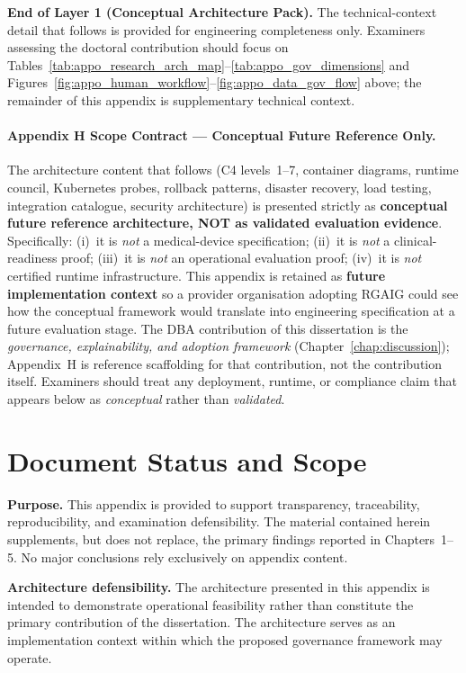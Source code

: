 \noindent\textbf{End of Layer 1 (Conceptual Architecture Pack).} The technical-context detail that follows is provided for engineering completeness only. Examiners assessing the doctoral contribution should focus on Tables~\ref{tab:appo_research_arch_map}--\ref{tab:appo_gov_dimensions} and Figures~\ref{fig:appo_human_workflow}--\ref{fig:appo_data_gov_flow} above; the remainder of this appendix is supplementary technical context.

\paragraph{Appendix H Scope Contract --- Conceptual Future Reference Only.}
\label{para:appendix_h_scope_contract}
The architecture content that follows (C4 levels~1--7, container diagrams, runtime council, Kubernetes probes, rollback patterns, disaster recovery, load testing, integration catalogue, security architecture) is presented strictly as \textbf{conceptual future reference architecture, NOT as validated evaluation evidence}. Specifically: (i)~it is \emph{not} a medical-device specification; (ii)~it is \emph{not} a clinical-readiness proof; (iii)~it is \emph{not} an operational evaluation proof; (iv)~it is \emph{not} certified runtime infrastructure. This appendix is retained as \textbf{future implementation context} so a provider organisation adopting RGAIG could see how the conceptual framework would translate into engineering specification at a future evaluation stage. The DBA contribution of this dissertation is the \emph{governance, explainability, and adoption framework} (Chapter~\ref{chap:discussion}); Appendix~H is reference scaffolding for that contribution, not the contribution itself. Examiners should treat any deployment, runtime, or compliance claim that appears below as \emph{conceptual} rather than \emph{validated}.

\section{Document Status and Scope}


\noindent\textbf{Purpose.} This appendix is provided to support transparency, traceability, reproducibility, and examination defensibility. The material contained herein supplements, but does not replace, the primary findings reported in Chapters~1--5. No major conclusions rely exclusively on appendix content.


\noindent\textbf{Architecture defensibility.} The architecture presented in this appendix is intended to demonstrate operational feasibility rather than constitute the primary contribution of the dissertation. The architecture serves as an implementation context within which the proposed governance framework may operate.

